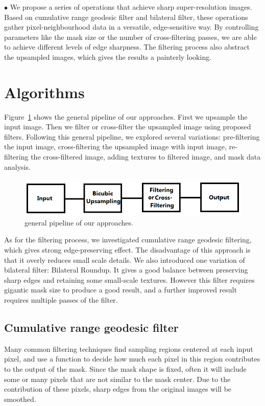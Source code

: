 $\bullet$ We propose a series of operations that achieve sharp super-resolution images. Based on cumulative range geodesic filter and bilateral filter, these operations gather pixel-neighbourhood data in a versatile, edge-sensitive way.  By controlling parameters like the mask size or the number of cross-filtering passes, we are able to achieve different levels of edge sharpness. The filtering process also abstract the upsampled images, which gives the results a painterly looking.


\section{Algorithms}

Figure~\ref{fig:generalPipeline} shows the general pipeline of our approaches. First we upsample the input image. Then we filter or cross-filter the upsampled image using proposed filters. Following this general pipeline, we explored several variations: pre-filtering the input image, cross-filtering the upsampled image with input image, re-filtering the cross-filtered image, adding textures to filtered image, and mask data analysis.

\begin{figure}[htbp]\centering
\includegraphics[width=5.9in]{f3}
\caption{general pipeline of our approaches.}
\label {fig:generalPipeline}
\end{figure}

As for the filtering process, we investigated cumulative range geodesic filtering, which gives strong edge-preserving effect. The disadvantage of this approach is that it overly reduces small scale details. We also introduced one variation of bilateral filter: Bilateral Roundup. It gives a good balance between preserving sharp edges and retaining some small-scale textures. However this filter requires gigantic mask size to produce a good result, and a further improved result requires multiple passes of the filter. 

\subsection{Cumulative range geodesic filter}

Many common filtering techniques find sampling regions centered at each input pixel, and use a function to decide how much each pixel in this region contributes to the output of the mask. Since the mask shape is fixed, often it will include some or many pixels that are not similar to the mask center. Due to the contribution of these pixels, sharp edges from the original images will be smoothed.

